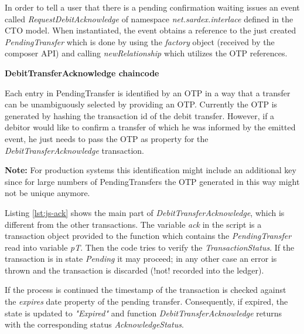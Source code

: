 In order to tell a user that there is a pending confirmation waiting  issues an event called \textit{RequestDebitAcknowledge} of namespace \textit{net.sardex.interlace} defined in the CTO model. When instantiated, the event obtains a reference to the just created \textit{PendingTransfer} which is done by using the \textit{factory} object (received by the composer API) and calling \textit{newRelationship} which utilizes the OTP references.

\textbf{DebitTransferAcknowledge chaincode}

Each entry in PendingTransfer is identified by an OTP in a way that a transfer can be unambiguously selected by providing an OTP. Currently the OTP is generated by hashing the transaction id of the debit transfer. However, if a debitor would like to confirm a transfer of which he was informed by the emitted event, he just needs to pass the OTP as property for the \textit{DebitTransferAcknowledge} transaction.

\textbf{Note:} For production systems this identification might include an additional key since for large numbers of PendingTransfers the OTP generated in this way might not be unique anymore.

Listing \ref{lst:js-ack} shows the main part of \textit{DebitTransferAcknowledge}, which is different from the other transactions. The variable \textit{ack} in the script is a transaction object provided to the function which contains the \textit{PendingTransfer} read into variable \textit{pT}. Then the code tries to verify the \textit{TransactionStatus}. If the transaction is in state \textit{Pending} it may proceed; in any other case an error is thrown and the transaction is discarded (!not! recorded into the ledger).

If the process is continued the timestamp of the transaction is checked against the \textit{expires} date property of the pending transfer. Consequently, if expired, the state is updated to \textit{"Expired"} and function \textit{DebitTransferAcknowledge} returns with the corresponding status \textit{AcknowledgeStatus}.

